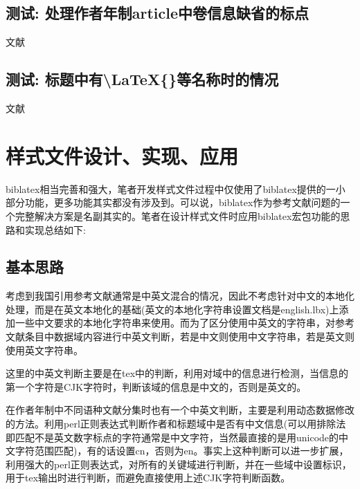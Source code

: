 \subsection{测试: 处理作者年制article中卷信息缺省的标点}\label{sec:article:novol}
\begin{refsection}
文献\cite{刘彻东1998-38-39}\cite{亚洲地质图编目组1978-194-208}
\cite{高光明1998-60-65}

\printbibliography[heading=subbibliography,title=【author-year style:article without volume】]
\end{refsection}

\subsection{测试: 标题中有\textbackslash LaTeX\{\}等名称时的情况}\label{sec:with:latex}
\begin{refsection}
文献\cite{Peebles2001-100-100}\cite{赵凯华1995--}\cite{蒋有绪1998--}

\printbibliography[heading=subbibliography,title=【title with \textbackslash LaTeX\{\}】]
\end{refsection}




\section{样式文件设计、实现、应用}\label{sec:biblatex:mech}
biblatex相当完善和强大，笔者开发样式文件过程中仅使用了biblatex提供的一小部分功能，更多功能其实都没有涉及到。可以说，biblatex作为参考文献问题的一个完整解决方案是名副其实的。笔者在设计样式文件时应用biblatex宏包功能的思路和实现总结如下:

\subsection{基本思路}

考虑到我国引用参考文献通常是中英文混合的情况，因此不考虑针对中文的本地化处理，而是在英文本地化的基础(英文的本地化字符串设置文档是english.lbx)上添加一些中文要求的本地化字符串来使用。而为了区分使用中英文的字符串，对参考文献条目中数据域内容进行中英文判断，若是中文则使用中文字符串，若是英文则使用英文字符串。

这里的中英文判断主要是在tex中的判断，利用对域中的信息进行检测，当信息的第一个字符是CJK字符时，判断该域的信息是中文的，否则是英文的。

在作者年制中不同语种文献分集时也有一个中英文判断，主要是利用动态数据修改的方法。利用perl正则表达式判断作者和标题域中是否有中文信息(可以用排除法即匹配不是英文数字标点的字符通常是中文字符，当然最直接的是用unicode的中文字符范围匹配)，有的话设置cn，否则为en。事实上这种判断可以进一步扩展，利用强大的perl正则表达式，对所有的关键域进行判断，并在一些域中设置标识，用于tex输出时进行判断，而避免直接使用上述CJK字符判断函数。


